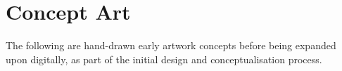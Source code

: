 \chapter{Concept Art}
\label{Concept Art}

The following are hand-drawn early artwork concepts before being expanded upon digitally, as part of the initial design and conceptualisation process.

% 